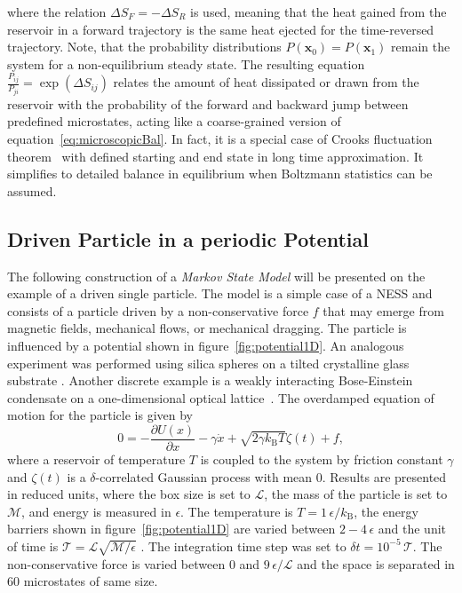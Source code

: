 where the relation $\Delta S_F = - \Delta S_R$ is used, meaning that the heat gained from the reservoir in a forward trajectory is the same heat ejected for the time-reversed trajectory.  Note, that the probability distributions $P(\mathbf{x}_0)=P(\mathbf{x}_1)$ remain the system  for a non-equilibrium steady state. The resulting equation $\frac{P_{ij}}{P_{ji}}= \exp (\Delta S_{ij})$ relates the amount of heat dissipated or drawn from the reservoir with the probability of the forward and backward jump between predefined microstates, acting like a coarse-grained version of equation~\ref{eq:microscopicBal}. In fact, it is a special case of Crooks fluctuation theorem~\cite{crooks1999entropy} with defined starting and end state in long time approximation. It simplifies to detailed balance in equilibrium when Boltzmann statistics can be assumed.
  
\subsection{Driven Particle in a periodic Potential}
\label{sec:1Dmodel}
The following construction of a \textit{Markov State Model} will be presented on the example of a driven single particle. The model is a simple case of a NESS \cite{speck2007distribution} and consists of a 
particle driven by a non-conservative force $f$ that may emerge from
magnetic fields, mechanical flows, or mechanical dragging. The particle is influenced by a potential shown in figure~\ref{fig:potential1D}.
An analogous experiment was performed using silica spheres on a
tilted crystalline glass substrate \cite{ma2017colloidal}. Another discrete example is a weakly interacting Bose-Einstein condensate on a one-dimensional optical lattice~\cite{labouvie2015non}. The overdamped equation of
motion for the particle is given by
\begin{equation}
0 = -\frac{\partial U( x)}{\partial x} - \gamma \dot x+ \sqrt{2\gamma k_{\mathrm{B}} T} 
\zeta(t) + f,
\end{equation}
where a reservoir of temperature $T$ is coupled to the
system by friction constant $\gamma$ and  $\zeta(t)$ is a $\delta$-correlated
Gaussian process with mean $0$.  Results are presented in reduced units,
where the box size is set to $\mathcal{L}$, the mass of the particle
is set to $\mathcal{M}$, and energy is measured in $\epsilon$. The
temperature is $T = 1\,\epsilon / k_{\mathrm{B}}$, the energy
barriers shown in figure~\ref{fig:potential1D} are varied between $2-4\,\epsilon$ and 
the unit of time is $\mathcal{T} = \mathcal{L}
\sqrt{\mathcal{M}/{\epsilon}}$ .  The integration
time step was set to $\delta t = 10^{-5}\,\mathcal{T}$.  The
non-conservative force is varied between 0 and $9\,\epsilon /
\mathcal{L}$ and the space is separated in 60 microstates of same size.

